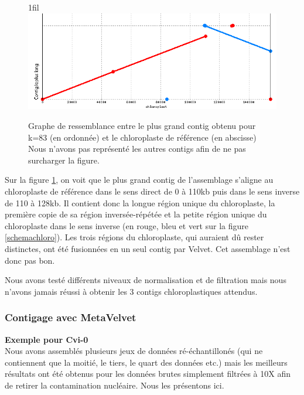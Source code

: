 \documentclass[a4paper]{article}
\makeatletter
\newcommand*{\centerfloat}{%
  \parindent \z@
  \leftskip \z@ \@plus 1fil \@minus \textwidth
  \rightskip\leftskip
  \parfillskip \z@skip}
\makeatother
\begin{document}
\begin{figure}[!ht]
\centerfloat
\includegraphics[scale=0.7] {Assemblage/chloro_83.png}
\caption{Graphe de ressemblance entre le plus grand contig obtenu pour k=83 (en ordonnée) et le chloroplaste de référence (en abscisse)\\
Nous n'avons pas représenté les autres contigs afin de ne pas surcharger la figure.}
\label{chloro_83}
\end{figure}

Sur la figure \ref{chloro_83}, on voit que le plus grand contig de l'assemblage s'aligne au chloroplaste de référence dans le sens direct de 0 à 110kb puis dans le sens inverse de 110 à 128kb. Il contient donc la longue région unique du chloroplaste, la première copie de sa région inversée-répétée et la petite région unique du chloroplaste dans le sens inverse (en rouge, bleu et vert sur la figure \ref{schemachloro}). Les trois régions du chloroplaste, qui auraient dû rester distinctes, ont été fusionnées en un seul contig par Velvet. Cet assemblage n'est donc pas bon.

Nous avons testé différents niveaux de normalisation et de filtration mais nous n'avons jamais réussi à obtenir les 3 contigs chloroplastiques attendus. 

\subsubsection{Contigage avec MetaVelvet}
\hspace{1.5cm}\textbf{\small Exemple pour Cvi-0}\\

Nous avons assemblés plusieurs jeux de données ré-échantillonés (qui ne contiennent que la moitié, le tiers, le quart des données etc.) mais les meilleurs résultats ont été obtenus pour les données brutes simplement filtrées à 10X afin de retirer la contamination nucléaire. Nous les présentons ici. 
\end{document}
